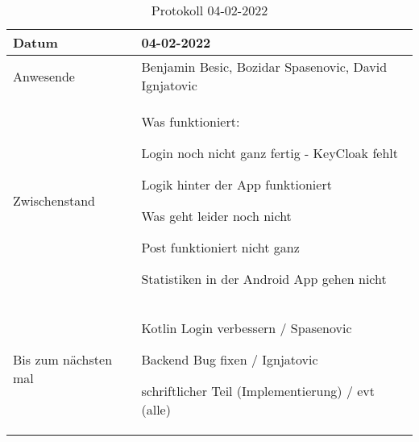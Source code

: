 \begin{table}
    \begin{tabular}{ |p{3cm}|p{10cm}|  }
        \hline
        Datum & 04-02-2022\\
        \hline
        Anwesende & Benjamin Besic, Bozidar Spasenovic, David Ignjatovic\\

        \hline
        Zwischenstand& 

        Was funktioniert:

    Login noch nicht ganz fertig - KeyCloak fehlt

    Logik hinter der App funktioniert

    Was geht leider noch nicht

    Post funktioniert nicht ganz

    Statistiken in der Android App gehen nicht




    
    \\
        \hline
        Bis zum nächsten mal & 





        Kotlin Login verbessern / Spasenovic

        Backend Bug fixen / Ignjatovic
    
        schriftlicher Teil (Implementierung) / evt (alle)
    
    


    
    
    
    \\
        \hline
    \end{tabular}
    \caption{Protokoll 04-02-2022}
    \label{tab:my_label}
\end{table}
